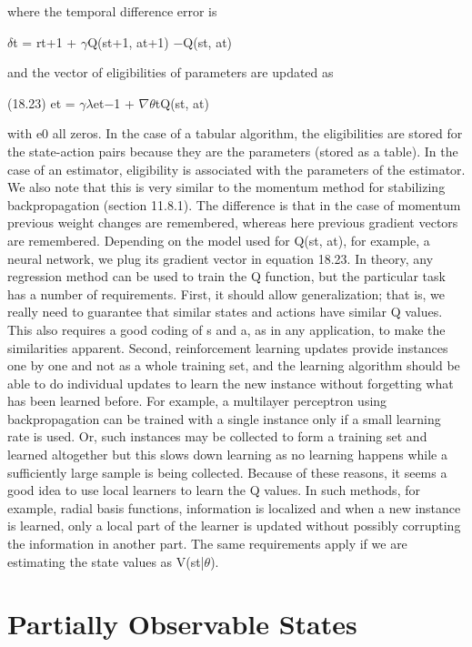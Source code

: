 where the temporal difference error is

$\delta$t = rt+1 + $\gamma$Q(st+1, at+1) $-$Q(st, at)

and the vector of eligibilities of parameters are updated as

(18.23) et = $\gamma$$\lambda$et$-$1 + $\nabla$$\theta$tQ(st, at)

with e0 all zeros. In the case of a tabular algorithm, the eligibilities are stored for the state-action pairs because they are the parameters (stored as a table). In the case of an estimator, eligibility is associated with the parameters of the estimator. We also note that this is very similar to the momentum method for stabilizing backpropagation (section 11.8.1). The difference is that in the case of momentum previous weight changes are remembered, whereas here previous gradient vectors are remembered. Depending on the model used for Q(st, at), for example, a neural network, we plug its gradient vector in equation 18.23. In theory, any regression method can be used to train the Q function, but the particular task has a number of requirements. First, it should allow generalization; that is, we really need to guarantee that similar states and actions have similar Q values. This also requires a good coding of s and a, as in any application, to make the similarities apparent. Second, reinforcement learning updates provide instances one by one and not as a whole training set, and the learning algorithm should be able to do individual updates to learn the new instance without forgetting what has been learned before. For example, a multilayer perceptron using backpropagation can be trained with a single instance only if a small learning rate is used. Or, such instances may be collected to form a training set and learned altogether but this slows down learning as no learning happens while a sufficiently large sample is being collected. Because of these reasons, it seems a good idea to use local learners to learn the Q values. In such methods, for example, radial basis functions, information is localized and when a new instance is learned, only a local part of the learner is updated without possibly corrupting the information in another part. The same requirements apply if we are estimating the state values as V(st|$\theta$).

\section{Partially Observable States}

